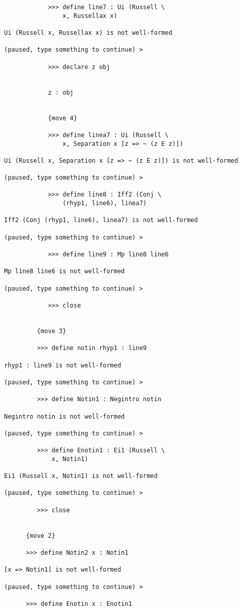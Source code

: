 \documentclass[12pt]{article}
\begin{document}
\begin{verbatim}
            >>> define line7 : Ui (Russell \
                x, Russellax x)

Ui (Russell x, Russellax x) is not well-formed

(paused, type something to continue) >

            >>> declare z obj


            z : obj


            {move 4}

            >>> define linea7 : Ui (Russell \
                x, Separation x [z => ~ (z E z)])

Ui (Russell x, Separation x [z => ~ (z E z)]) is not well-formed

(paused, type something to continue) >

            >>> define line8 : Iff2 (Conj \
                (rhyp1, line6), linea7)

Iff2 (Conj (rhyp1, line6), linea7) is not well-formed

(paused, type something to continue) >

            >>> define line9 : Mp line8 line6

Mp line8 line6 is not well-formed

(paused, type something to continue) >

            >>> close


         {move 3}

         >>> define notin rhyp1 : line9

rhyp1 : line9 is not well-formed

(paused, type something to continue) >

         >>> define Notin1 : Negintro notin

Negintro notin is not well-formed

(paused, type something to continue) >

         >>> define Enotin1 : Ei1 (Russell \
             x, Notin1)

Ei1 (Russell x, Notin1) is not well-formed

(paused, type something to continue) >

         >>> close


      {move 2}

      >>> define Notin2 x : Notin1

[x => Notin1] is not well-formed

(paused, type something to continue) >

      >>> define Enotin x : Enotin1


\end{verbatim}
\end{document}
